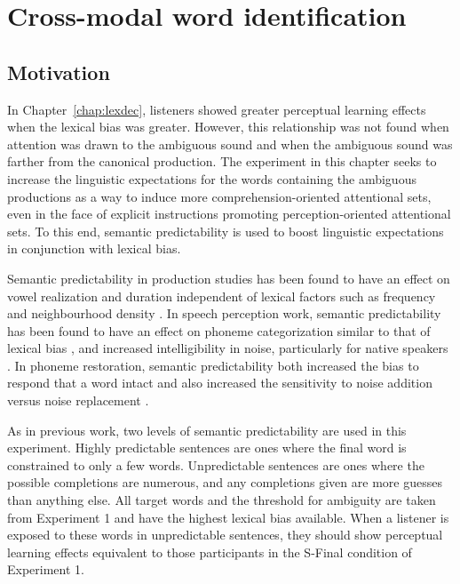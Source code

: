 
\chapter{Cross-modal word identification}
\label{chap:sent}


\section{Motivation}

In Chapter~\ref{chap:lexdec}, listeners showed greater perceptual learning effects when the lexical bias was greater.  
However, this relationship was not found when attention was drawn to the ambiguous sound and when the ambiguous sound was farther from the canonical production.  
The experiment in this chapter seeks to increase the linguistic expectations for the words containing the ambiguous productions as a way to induce more comprehension-oriented attentional sets, even in the face of explicit instructions promoting perception-oriented attentional sets.  
To this end, semantic predictability is used to boost linguistic expectations in conjunction with lexical bias.

Semantic predictability in production studies has been found to have an effect on vowel realization and duration independent of lexical factors such as frequency and neighbourhood density \citep{Scarborough2010, Clopper2008}.  
In speech perception work, semantic predictability has been found to have an effect on phoneme categorization similar to that of lexical bias \citep{Borsky1998}, and increased intelligibility in noise, particularly for native speakers \citep[and others]{Kalikow1977, Mayo1997, Fallon2002, Bradlow2007}.
In phoneme restoration, semantic predictability both increased the bias to respond that a word intact and also increased the sensitivity to noise addition versus noise replacement \citep{Samuel1981}.

As in previous work, two levels of semantic predictability are used in this experiment.  
Highly predictable sentences are ones where the final word is constrained to only a few words.  
Unpredictable sentences are ones where the possible completions are numerous, and any completions given are more guesses than anything else.
All target words and the threshold for ambiguity are taken from Experiment 1 and have the highest lexical bias available.
When a listener is exposed to these words in unpredictable sentences, they should show perceptual learning effects equivalent to those participants in the S-Final condition of Experiment 1.

